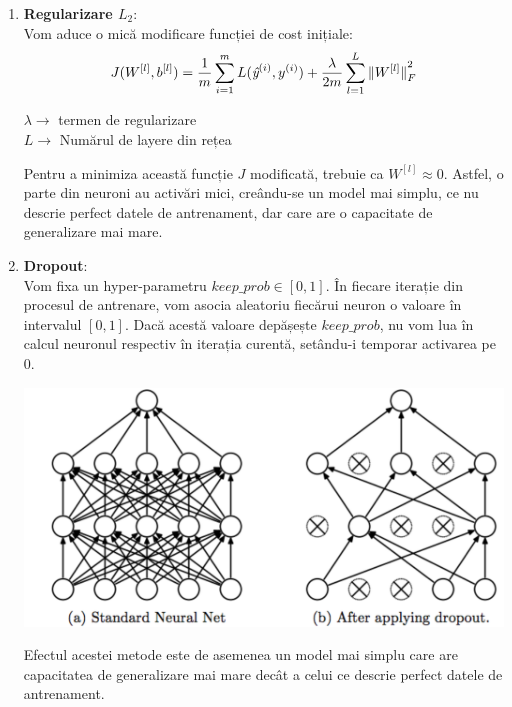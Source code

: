 \begin{enumerate}
\item \textbf{Regularizare $L_2$}: \\
Vom aduce o mică modificare funcției de cost inițiale:
$$\displaystyle{J(W^{[l]},b^{[l]})=\frac{1}{m}\sum\limits_{i=1}^{m}L(\textit{\^{y}}^{(i)}, y^{(i)}) + \frac{\lambda}{2m}\sum\limits_{l=1}^{L}{\Vert W^{[l]} \Vert}_{F}^{2}}$$

$\lambda \rightarrow$ termen de regularizare \\
$L \rightarrow$ Numărul de layere din rețea 

Pentru a minimiza această funcție $J$ modificată, trebuie ca $W^{[l]} \approx 0$. Astfel, o parte din neuroni au activări mici, creându-se un model mai simplu, ce nu descrie perfect datele de antrenament, dar care are o capacitate de generalizare mai mare.

\item \textbf{Dropout}: \\
Vom fixa un hyper-parametru $keep\_prob \in [0,1]$. În fiecare iterație din procesul de antrenare, vom asocia aleatoriu fiecărui neuron o valoare în intervalul $[0,1]$. Dacă acestă valoare depășește $keep\_prob$, nu vom lua în calcul neuronul respectiv în iterația curentă, setându-i temporar activarea pe 0.

\begin{center}
\includegraphics[scale=0.3]{dropout}
\end{center}

Efectul acestei metode este de asemenea un model mai simplu care are capacitatea de generalizare mai mare decât a celui ce descrie perfect datele de antrenament.

\end{enumerate}



